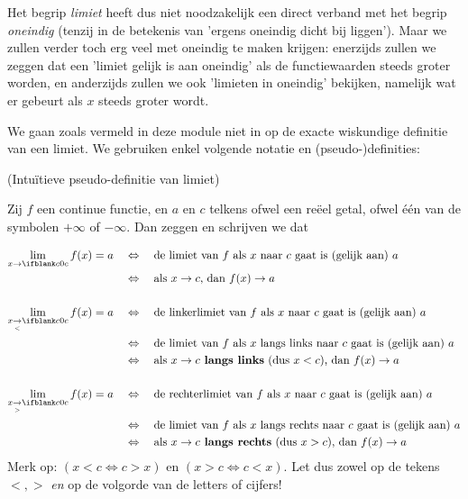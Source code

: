 \documentclass[numbers]{ximera}
\begin{document}
 Het begrip \textit{limiet} heeft dus niet noodzakelijk een direct verband met het begrip \textit{oneindig} (tenzij in de betekenis van 'ergens oneindig dicht bij liggen'). Maar we zullen verder toch erg veel met oneindig te maken krijgen: enerzijds zullen we zeggen dat een 'limiet gelijk is aan oneindig' als de functiewaarden steeds groter worden, en anderzijds zullen we ook 'limieten in oneindig' bekijken, namelijk wat er gebeurt als $x$ steeds groter wordt.


We gaan zoals vermeld in deze module niet in op de exacte wiskundige definitie van een limiet. We gebruiken enkel volgende notatie en (pseudo-)definities:

\begin{definition} (Intuïtieve pseudo-definitie van limiet)
	
	Zij $f$ een continue functie, en $a$ en $c$ telkens ofwel een reëel getal, ofwel één van de symbolen $+\infty$ of $-\infty$. 
	Dan zeggen en schrijven we dat 

\begin{align*}
	\limx[c]  f(x) = a & \quad\iff\quad \text{de limiet van $f$ als $x$ naar $c$ gaat is (gelijk aan) $a$} \\
	                   & \quad\iff\quad \text{als }x\to c\text{, dan } 									f(x) \to a \\
	                   \\
	\llimx[c] f(x) = a & \quad\iff\quad \text{de linkerlimiet van $f$ als $x$ naar $c$ gaat is (gelijk aan) $a$} \\
	                   & \quad\iff\quad \text{de limiet van $f$ als $x$ langs links naar $c$ gaat is (gelijk aan) $a$} \\
	                   & \quad\iff\quad \text{als }x\to c\text{\textbf{ langs links} (dus $x<c$), dan } f(x) \to a \\
	                   \\
	\rlimx[c] f(x) = a & \quad\iff\quad \text{de rechterlimiet van $f$ als $x$ naar $c$ gaat is (gelijk aan) $a$} \\
					   & \quad\iff\quad \text{de limiet van $f$ als $x$ langs rechts naar $c$ gaat is (gelijk aan) $a$} \\
					   & \quad\iff\quad \text{als }x\to c\text{\textbf{ langs rechts} (dus $x>c$), dan }f(x) \to a 
\end{align*}
Merk op: $(x<c\iff c>x)$ en $(x>c \iff c<x)$. Let dus zowel op de tekens $<,>$ \textit{en} op de volgorde van de letters of cijfers!  
\end{definition}
\end{document}
